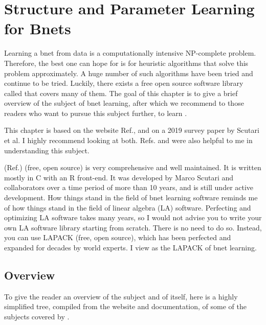 \chapter{Structure and Parameter
 Learning for Bnets}\label{ch-struc-learn}


Learning a bnet
from data
is a computationally intensive NP-complete
problem. 
Therefore,
the best one can hope
for is for heuristic algorithms 
that solve this problem
approximately. A huge number 
of such algorithms have been tried
and continue to be tried.
Luckily,
there exists a free open source
 software library
called \bnlearn
that covers many of
them. The goal
of this chapter
is to give
a brief
overview
of the subject
of bnet 
learning,
after 
which
we recommend
to
those readers who
want to
pursue this subject
further,
to 
learn \bnlearn.

This chapter
is based on  
the \bnlearn website Ref.\cite{bnlearn}, and
on a 2019 survey
paper 
\cite{scutari2019}
by Scutari et al.
I highly recommend looking
at both. Refs.
\cite{carvalho} and \cite{margaritis}
were also
helpful to me in understanding this subject.

\bnlearn (Ref.\cite{bnlearn})
(free, open source) is 
very
comprehensive
and well
maintained. It
is 
written 
mostly in C with
an R front-end.
It was
developed by Marco Scutari
and collaborators
over a time period of
more than 10 years,
and is still
under active development.
How things stand
in the field of
bnet learning software reminds me
of how things stand in 
the field of linear 
algebra (LA) software. Perfecting and
optimizing
LA software
takes many years, so
I would not
advise you to write your own
LA software library starting
from scratch.
There is no need to do so. Instead, you
can use LAPACK (free, open source), which
has been perfected and expanded
for decades by world experts. 
I view \bnlearn as the LAPACK
of bnet learning. 



\section{Overview}

To give
the reader an overview
of the subject
and of \bnlearn itself,
here is a highly
simplified tree,
compiled from
the \bnlearn website
and documentation,
of some of the
subjects covered by \bnlearn.



